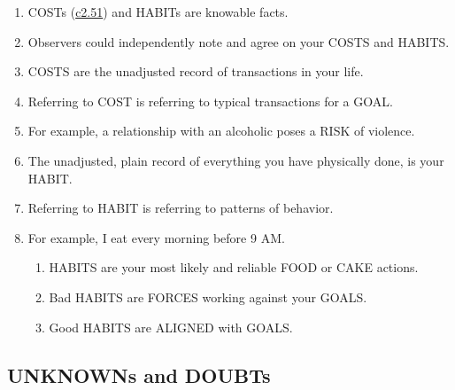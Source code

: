 \documentclass[
]{book}
\providecommand{\tightlist}{%
  \setlength{\itemsep}{0pt}\setlength{\parskip}{0pt}}
\begin{document}
\begin{enumerate}
\def\labelenumi{\arabic{enumi}.}
\setcounter{enumi}{41}
\item
  COSTs (\protect\hyperlink{self-1}{c2.51}) and HABITs are knowable facts.
\item
  Observers could independently note and agree on your COSTS and HABITS.
\item
  COSTS are the unadjusted record of transactions in your life.
\item
  Referring to COST is referring to typical transactions for a GOAL.
\item
  For example, a relationship with an alcoholic poses a RISK of violence.
\item
  The unadjusted, plain record of everything you have physically done, is your HABIT.
\item
  Referring to HABIT is referring to patterns of behavior.
\item
  For example, I eat every morning before 9 AM.

  \begin{enumerate}
  \def\labelenumii{\arabic{enumii}.}
  \tightlist
  \item
    HABITS are your most likely and reliable FOOD or CAKE actions.
  \item
    Bad HABITS are FORCES working against your GOALS.
  \item
    Good HABITS are ALIGNED with GOALS.
  \end{enumerate}
\end{enumerate}

\hypertarget{unknowns-and-doubts}{%
\subsection{UNKNOWNs and DOUBTs}\label{unknowns-and-doubts}}
\end{document}
